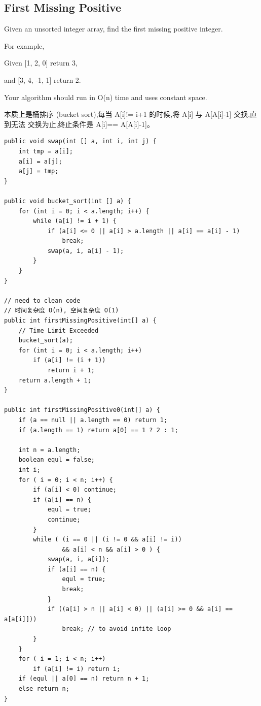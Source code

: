 \documentclass[12pt]{book}
\begin{document}
\subsection{First Missing Positive}
\label{sec-7-3-3}
Given an unsorted integer array, find the first missing positive integer.

For example,

Given [1, 2, 0] return 3, 

and [3, 4, -1, 1] return 2.

Your algorithm should run in O(n) time and uses constant space.

本质上是桶排序 (bucket sort),每当 A[i]!= i+1 的时候,将 A[i] 与 A[A[i]-1] 交换,直到无法
交换为止,终止条件是 A[i]== A[A[i]-1]。

\lstset{language=java,label= ,caption= ,numbers=none}
\begin{lstlisting}
public void swap(int [] a, int i, int j) {        
    int tmp = a[i];
    a[i] = a[j];
    a[j] = tmp;
}
        
public void bucket_sort(int [] a) {
    for (int i = 0; i < a.length; i++) {
        while (a[i] != i + 1) {
            if (a[i] <= 0 || a[i] > a.length || a[i] == a[i] - 1)
                break;
            swap(a, i, a[i] - 1);
        }
    }
}

// need to clean code
// 时间复杂度 O(n), 空间复杂度 O(1)
public int firstMissingPositive(int[] a) {
    // Time Limit Exceeded
    bucket_sort(a);
    for (int i = 0; i < a.length; i++) 
        if (a[i] != (i + 1))
            return i + 1;
    return a.length + 1;
}

public int firstMissingPositive0(int[] a) {
    if (a == null || a.length == 0) return 1;
    if (a.length == 1) return a[0] == 1 ? 2 : 1;
            
    int n = a.length;
    boolean equl = false;
    int i;
    for ( i = 0; i < n; i++) {
        if (a[i] < 0) continue;
        if (a[i] == n) {
            equl = true;
            continue;
        }
        while ( (i == 0 || (i != 0 && a[i] != i))
                && a[i] < n && a[i] > 0 ) {
            swap(a, i, a[i]);
            if (a[i] == n) {
                equl = true;
                break;
            }
            if ((a[i] > n || a[i] < 0) || (a[i] >= 0 && a[i] == a[a[i]]))
                break; // to avoid infite loop
        }
    }
    for ( i = 1; i < n; i++) 
        if (a[i] != i) return i;
    if (equl || a[0] == n) return n + 1;
    else return n;
}
\end{lstlisting}
\end{document}
